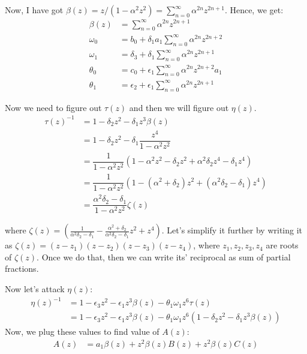 \documentclass[11pt,a4paper]{article}
\begin{document}
Now, I have got $\beta(z) = z/(1 -\alpha^2  z^2 ) = \sum_{n=0}^{\infty} \alpha^{2n}z^{2n+1}$. Hence, we get:
\begin{align*}
\beta(z) &= \sum_{n=0}^{\infty} \alpha^{2n}z^{2n+1} \\
 \omega_0 &= b_0 +  \delta_1       a_1  \sum_{n=0}^{\infty} \alpha^{2n}z^{2n+2} \\
 \omega_1 &= \delta_3 +  \delta_1  \sum_{n=0}^{\infty} \alpha^{2n}z^{2n+1}\\
 \theta_0&= c_0 +  \epsilon_1   \sum_{n=0}^{\infty} \alpha^{2n}z^{2n+2} a_1\\
 \theta_1&= \epsilon_2 + \epsilon_1   \sum_{n=0}^{\infty} \alpha^{2n}z^{2n+1}
\end{align*}

Now we need to figure out $\tau(z)$ and then we will figure out $\eta(z)$.
\begin{align*}
\tau(z)^{-1} &=  1 - \delta_2 z^2 -\delta_1  z^3   \beta(z)  \\
&=  1 - \delta_2 z^2 -\delta_1  \dfrac{z^4}{ 1 -\alpha^2  z^2 }    \\
&=  \dfrac{1} {1 -\alpha^2  z^2 }   (1 -\alpha^2  z^2- \delta_2 z^2 + \alpha^2 \delta_2 z^4 -\delta_1 z^4) \\
&=  \dfrac{1} {1 -\alpha^2  z^2 }   (1 -(\alpha^2 + \delta_2) z^2 + (\alpha^2 \delta_2 -\delta_1) z^4) \\
&= \dfrac{\alpha^2 \delta_2 -\delta_1} {1 -\alpha^2  z^2 } \zeta  (z) 
\end{align*}

where $\zeta (z)= (\frac{1}{\alpha^2 \delta_2 -\delta_1} -\frac{\alpha^2 + \delta_2}{\alpha^2 \delta_2 -\delta_1} z^2 +  z^4)$. Let's simplify it further by writing it as $\zeta (z)= (z-z_1)(z-z_2)(z-z_3)(z-z_4)$, where $z_1, z_2, z_3,z_4$ are roots of $\zeta (z)$. Once we do that, then we can write its' reciprocal as sum of partial fractions. 


Now let's attack $\eta(z)$:
\begin{align*}
\eta(z)^{-1}&=1 - \epsilon_3 z^2 - \epsilon_1  z^3   \beta(z) -\theta_1   \omega_1  z^6 \tau(z)  \\
 &=1 - \epsilon_3 z^2 - \epsilon_1  z^3   \beta(z) -\theta_1   \omega_1  z^6 ( 1 - \delta_2 z^2 -\delta_1  z^3   \beta(z) ) 
\end{align*}
Now, we plug these values to find value of $A(z)$:
\begin{align}
A(z)  &=   a_1 \beta(z)   +  z^2 \beta(z) B(z) + z^2 \beta(z) C(z) 
\end{align}
\end{document}

